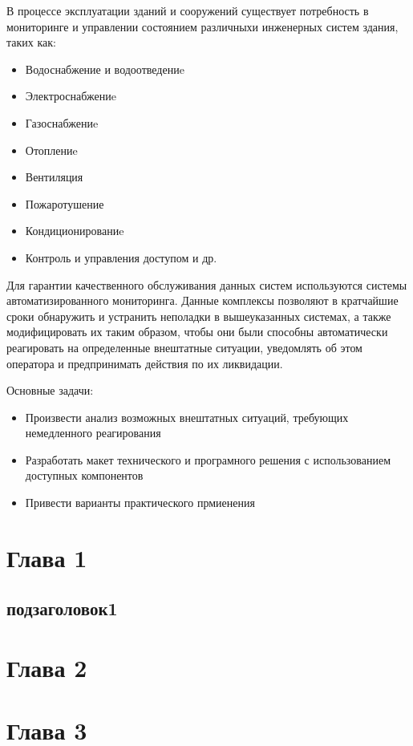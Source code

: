 \newpage
{}
В процессе эксплуатации зданий и сооружений существует потребность в мониторинге и управлении состоянием различныхи инженерных систем здания, таких как:

\begin{itemize}
	\itemsep0em 
	\item Водоснабжение и водоотведениe
	\item Электроснабжениe
	\item Газоснабжениe
	\item Отоплениe
	\item Вентиляция
	\item Пожаротушение
	\item Кондиционированиe
	\item Контроль и управления доступом и др.
\end{itemize}

Для гарантии качественного обслуживания данных систем используются системы автоматизированного мониторинга. Данные комплексы позволяют в кратчайшие сроки обнаружить и устранить неполадки в вышеуказанных системах, а также модифицировать их таким образом, чтобы они были способны автоматически реагировать на определенные внештатные ситуации, уведомлять об этом оператора и предпринимать действия по их ликвидации.

Основные задачи:
\begin{itemize}
	\itemsep0em 
	\item Произвести анализ возможных внештатных ситуаций, требующих немедленного реагирования
	\item Разработать макет технического и програмного решения с использованием доступных компонентов
	\item Привести варианты практического прмиенения 
\end{itemize} 



\newpage\section{Глава 1}
\subsection{подзаголовок1}

\newpage\section{Глава 2}

\newpage\section{Глава 3}

\newpage{}